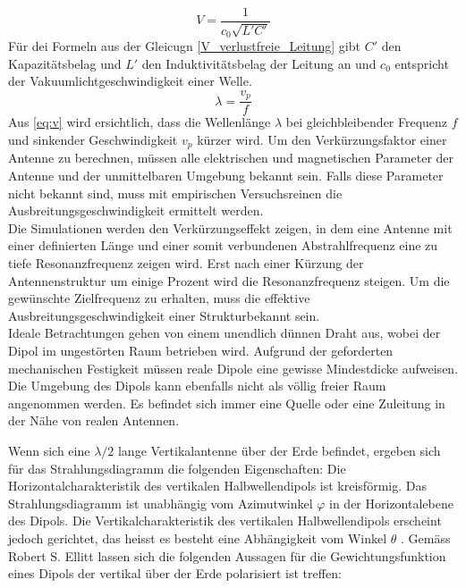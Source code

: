 \begin{equation}\label{V_verlustfreie_Leitung}
V=\dfrac{1}{c_0 \sqrt{L'C'}} 
\end{equation}
Für dei Formeln aus der Gleicugn \ref{V_verlustfreie_Leitung} gibt $C'$  den Kapazitätsbelag und $L'$ den Induktivitätsbelag  der Leitung an und $c_0$ entspricht der Vakuumlichtgeschwindigkeit einer Welle.
\begin{equation}\label{eq:v}
\lambda=\dfrac{v_p}{f}
\end{equation}  
Aus \ref{eq:v}  wird ersichtlich, dass die Wellenlänge $\lambda$ bei gleichbleibender Frequenz $f$ und sinkender Geschwindigkeit $v_p$ kürzer wird. 
Um den Verkürzungsfaktor einer Antenne zu berechnen, müssen alle elektrischen und magnetischen Parameter der Antenne und der unmittelbaren Umgebung bekannt sein. Falls diese Parameter  nicht bekannt sind, muss mit empirischen Versuchsreinen die Ausbreitungsgeschwindigkeit ermittelt werden.\\

Die Simulationen werden den Verkürzungseffekt zeigen, in dem eine Antenne mit einer definierten Länge und einer somit verbundenen Abstrahlfrequenz eine zu tiefe Resonanzfrequenz zeigen wird. Erst nach einer Kürzung der Antennenstruktur um einige Prozent wird die Resonanzfrequenz steigen. Um die gewünschte Zielfrequenz zu erhalten, muss die effektive Ausbreitungsgeschwindigkeit einer Strukturbekannt sein.\\

Ideale Betrachtungen gehen von einem unendlich dünnen Draht aus, wobei der Dipol im ungestörten Raum betrieben wird. Aufgrund der geforderten mechanischen Festigkeit müssen reale Dipole eine gewisse Mindestdicke aufweisen. Die Umgebung des Dipols kann ebenfalls nicht als völlig freier Raum angenommen werden. Es befindet sich immer eine Quelle oder eine Zuleitung in der Nähe von realen Antennen. 

Wenn sich eine $\lambda /2$ lange Vertikalantenne über der Erde befindet,  ergeben sich für das Strahlungsdiagramm die folgenden Eigenschaften: 
Die Horizontalcharakteristik des vertikalen Halbwellendipols ist kreisförmig. Das Strahlungsdiagramm ist unabhängig vom Azimutwinkel $\varphi$ in der Horizontalebene des Dipols. Die Vertikalcharakteristik des vertikalen Halbwellendipols erscheint jedoch gerichtet, das heisst es besteht eine Abhängigkeit vom Winkel $\theta$ \cite{zinke1965lehrbuch}. 
Gemäss Robert S. Ellitt \cite{elliott1981antenna} lassen sich die folgenden Aussagen für die Gewichtungsfunktion  eines Dipols der vertikal über der Erde polarisiert ist treffen\cite{elliott1981antenna}:

